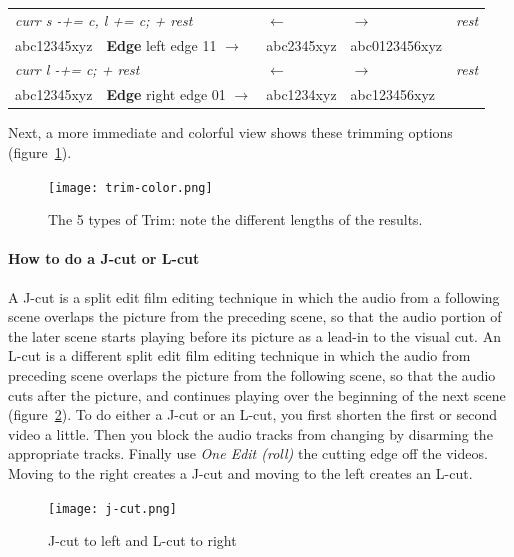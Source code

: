\begin{table}[ht]
{\begin{tabular}{lllll}
      \midrule
      \multicolumn{2}{l}{\textit{curr s -+= c, l += c; + rest}} & $\leftarrow$ & $\rightarrow$ & \textit{rest}\\
      abc12345xyz & \textbf{Edge} left edge 11 $\rightarrow$ & abc2345xyz & abc0123456xyz &\\
      \midrule
      \multicolumn{2}{l}{\textit{curr l -+= c; + rest}} & $\leftarrow$ & $\rightarrow$ & \textit{rest}\\
      abc12345xyz & \textbf{Edge} right edge 01 $\rightarrow$ & abc1234xyz & abc123456xyz &\\
      \bottomrule
    \end{tabular}
  }
\end{table}
\renewcommand{\arraystretch}{1}

Next, a more immediate and colorful view shows these trimming
options (figure~\ref{fig:trim-color}).

\begin{figure}[htpb]
    \centering
    \texttt{[image: trim-color.png]}
    \caption{The 5 types of Trim: note the different lengths of the results.}
    \label{fig:trim-color}
\end{figure}

\paragraph{How to do a J-cut or L-cut} A J-cut is a split edit film
editing technique in which the audio from a following scene overlaps
the picture from the preceding scene, so that the audio portion of
the later scene starts playing before its picture as a lead-in to
the visual cut.  An L-cut is a different split edit film editing
technique in which the audio from preceding scene overlaps the
picture from the following scene, so that the audio cuts after the
picture, and continues playing over the beginning of the next scene
(figure~\ref{fig:j-cut}). To do either a J-cut or an L-cut, you
first shorten the first or second video a little.  Then you block
the audio tracks from changing by disarming the appropriate tracks.
Finally use \textit{One Edit (roll)} the cutting edge off the
videos.  Moving to the right creates a J-cut and moving to the left
creates an L-cut.

\begin{figure}[htpb]
    \centering
    \texttt{[image: j-cut.png]}
    \caption{J-cut to left and L-cut to right}
    \label{fig:j-cut}
\end{figure}


